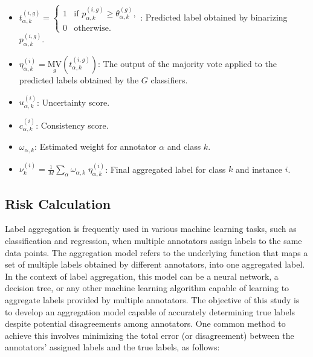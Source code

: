 \begin{itemize}
    \item  $t_{\alpha,k}^{(i,g)} =
        \begin{cases}
            1 & \text{if } p_{\alpha,k}^{(i,g)} \geq \theta_{\alpha,k}^{(g)}, \\
            0 & \text{otherwise}.
        \end{cases} $: Predicted label obtained by binarizing $p_{\alpha,k}^{(i,g)} $.

    \item  $\eta_{\alpha,k}^{(i)} = {{\underset g{\mathrm{MV}}}{ \left(t_{\alpha,k}^{(i,g)}\right) }} $: The output of the majority vote applied to the predicted labels obtained by the $G $ classifiers.

    \item  $u_{\alpha,k}^{(i)} $: Uncertainty score.

    \item  $c_{\alpha,k}^{(i)} $: Consistency score.

    \item  $\omega_{\alpha,k} $: Estimated weight for annotator $\alpha $ and class $k $.

    \item  $\nu_k^{(i)}=\frac{1}{{M}}{\sum_{\alpha}{\omega_{\alpha,k} \; \eta_{\alpha,k}^{(i)}}} $: Final aggregated label for class $k $ and instance $i $.

\end{itemize}

\subsection{Risk Calculation}

Label aggregation is frequently used in various machine learning tasks, such as classification and regression, when multiple annotators assign labels to the same data points. The aggregation model refers to the underlying function that maps a set of multiple labels obtained by different annotators, into one aggregated label. In the context of label aggregation, this model can be a neural network, a decision tree, or any other machine learning algorithm capable of learning to aggregate labels provided by multiple annotators. The objective of this study is to develop an aggregation model capable of accurately determining true labels despite potential disagreements among annotators. One common method to achieve this involves minimizing the total error (or disagreement) between the annotators' assigned labels and the true labels, as follows:


